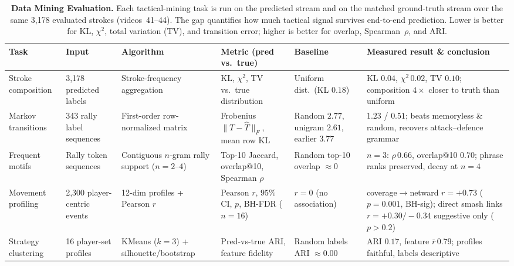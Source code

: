 \begin{table}[t]
  \caption{\textbf{Data Mining Evaluation.} Each tactical-mining task is run on
  the predicted stream and on the matched ground-truth stream over the same
  3{,}178 evaluated strokes (videos~41--44). The gap quantifies how much
  tactical signal survives end-to-end prediction. Lower is better for KL,
  $\chi^2$, total variation (TV), and transition error; higher is better for
  overlap, Spearman~$\rho$, and ARI.}
  \label{tab:mining_eval}
  \centering
  \footnotesize
  \setlength{\tabcolsep}{4pt}
  \begin{tabular}{p{1.7cm} p{2.5cm} p{2.6cm} p{2.7cm} p{2.5cm} p{3.4cm}}
    \toprule
    Task & Input & Algorithm & Metric (pred vs.\ true) & Baseline & Measured result \& conclusion \\
    \midrule
    Stroke composition
      & 3{,}178 predicted labels
      & Stroke-frequency aggregation
      & KL, $\chi^2$, TV vs.\ true distribution
      & Uniform dist.\ (KL $0.18$)
      & KL $0.04$, $\chi^2\,0.02$, TV $0.10$; composition $4\times$ closer to truth than uniform \\[2pt]

    Markov transitions
      & 343 rally label sequences
      & First-order row-normalized matrix
      & Frobenius $\lVert T-\hat{T}\rVert_F$, mean row KL
      & Random $2.77$, unigram $2.61$, earlier $3.77$
      & $1.23$ / $0.51$; beats memoryless \& random, recovers attack--defence grammar \\[2pt]

    Frequent motifs
      & Rally token sequences
      & Contiguous $n$-gram rally support ($n{=}2$--$4$)
      & Top-10 Jaccard, overlap@10, Spearman $\rho$
      & Random top-10 overlap $\approx 0$
      & $n{=}3$: $\rho\,0.66$, overlap@10 $0.70$; phrase ranks preserved, decay at $n{=}4$ \\[2pt]

    Movement profiling
      & 2{,}300 player-centric events
      & 12-dim profiles + Pearson $r$
      & Pearson $r$, $95\%$ CI, $p$, BH-FDR ($n{=}16$)
      & $r=0$ (no association)
      & coverage$\to$netward $r{=}{+}0.73$ ($p{=}0.001$, BH-sig); direct smash links $r{=}{+}0.30/{-}0.34$ suggestive only ($p{>}0.2$) \\[2pt]

    Strategy clustering
      & 16 player-set profiles
      & KMeans ($k{=}3$) + silhouette/bootstrap
      & Pred-vs-true ARI, feature fidelity
      & Random labels ARI $\approx 0.00$
      & ARI $0.17$, feature $\bar{r}\,0.79$; profiles faithful, labels descriptive \\
    \bottomrule
  \end{tabular}
\end{table}

